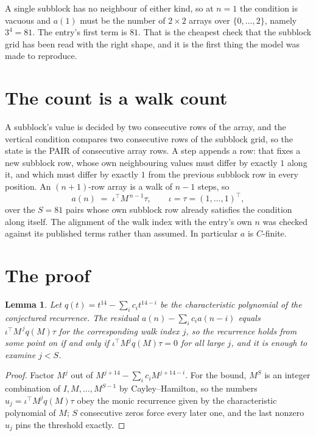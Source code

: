 \documentclass[11pt,a4paper]{article}
\theoremstyle{plain}
\newtheorem{lemma}[theorem]{Lemma}
\theoremstyle{definition}
\begin{document}
A single subblock has no neighbour of either kind, so at $n=1$ the condition is vacuous and
$a(1)$ must be the number of $2\times2$ arrays over $\{0,\dots,2\}$, namely
$3^{4}=81$. The entry's first term is $81$.
That is the cheapest check that the subblock grid has been read with the right shape, and it
is the first thing the model was made to reproduce.

\section{The count is a walk count}

A subblock's value is decided by two consecutive rows of the array, and the
vertical condition compares two consecutive rows of the subblock grid, so the state is the
PAIR of consecutive array rows. A step appends a row: that fixes a new subblock row, whose own
neighbouring values must differ by exactly $1$ along it, and which must differ by exactly
$1$ from the previous subblock row in every position. An $(n+1)$-row array is a walk of
$n-1$ steps, so
\[
a(n)\;=\;\iota^{\!\top}M^{\,n-1}\tau,\qquad\iota=\tau=(1,\dots,1)^{\!\top},
\]
over the $S=81$ pairs whose own subblock row already satisfies the condition along itself.
The alignment of the walk index with the entry's own $n$ was checked against its published
terms rather than assumed. In particular $a$ is $C$-finite.

\section{The proof}

\begin{lemma}\label{lem:crit}
Let $q(t)=t^{14}-\sum_i c_it^{14-i}$ be the characteristic polynomial of the
conjectured recurrence. The residual $a(n)-\sum_ic_ia(n-i)$ equals
$\iota^{\!\top}M^{\,j}q(M)\tau$ for the corresponding walk index $j$, so the recurrence
holds from some point on if and only if $\iota^{\!\top}M^{j}q(M)\tau=0$ for all large $j$,
and it is enough to examine $j<S$.
\end{lemma}

\begin{proof}
Factor $M^{j}$ out of $M^{j+14}-\sum_ic_iM^{j+14-i}$. For the bound, $M^{S}$
is an integer combination of $I,M,\dots,M^{S-1}$ by Cayley--Hamilton, so the numbers
$u_j=\iota^{\!\top}M^{j}q(M)\tau$ obey the monic recurrence given by the characteristic
polynomial of $M$; $S$ consecutive zeros force every later one, and the last nonzero $u_j$
pins the threshold exactly.
\end{proof}
\end{document}
